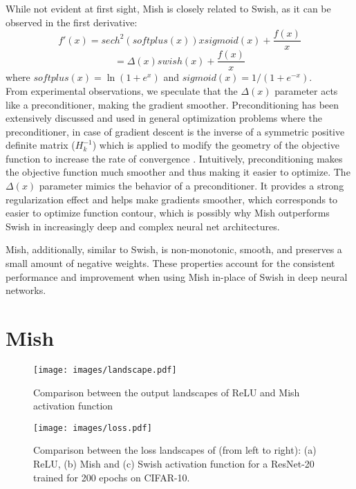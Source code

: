 \documentclass{bmvc2k}
\begin{document}
 
While not evident at first sight, Mish is closely related to Swish, as it can be observed in the first derivative:
\begin{equation}
f'(x) = {sech}^{2}(softplus(x))xsigmoid(x) + \frac{f(x)}{x}
\end{equation}
\begin{equation}
= \Delta(x)swish(x)+\frac{f(x)}{x} 
\end{equation}
where  $softplus(x) = \ln(1+{e}^{x})$ and  $sigmoid(x) = 1/(1+{e}^{-x})$. 
\\

From experimental observations, we speculate that the $\Delta(x)$ parameter acts like a preconditioner, making the gradient smoother. Preconditioning has been extensively discussed and used in general optimization problems where the preconditioner, in case of gradient descent \cite{bottou2010large, li2017preconditioned} is the inverse of a symmetric positive definite matrix ($H^{-1}_{k}$) which is applied to modify the geometry of the objective function to increase the rate of convergence \cite{axelsson1986rate}. Intuitively, preconditioning makes the objective function much smoother and thus making it easier to optimize. The $\Delta(x)$ parameter mimics the behavior of a preconditioner. It provides a strong regularization effect and helps make gradients smoother, which corresponds to easier to optimize function contour, which is possibly why Mish outperforms Swish in increasingly deep and complex neural net architectures. 

Mish, additionally, similar to Swish, is non-monotonic, smooth, and preserves a small amount of negative weights. These properties account for the consistent performance and improvement when using Mish in-place of Swish in deep neural networks.

\section{Mish}
\label{sec:mish}

\begin{figure}
	\centering
	\texttt{[image: images/landscape.pdf]}
	\caption{Comparison between the output landscapes of ReLU and Mish activation function}
	\label{fig:landscape}
\end{figure}

\begin{figure}
	\centering
	\texttt{[image: images/loss.pdf]}
	\caption{Comparison between the loss landscapes of (from left to right): (a) ReLU, (b) Mish and (c) Swish activation function for a ResNet-20 trained for 200 epochs on CIFAR-10.}
	\label{fig:loss}
\end{figure}
\end{document}

